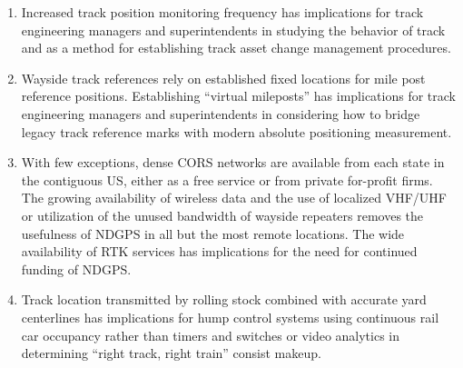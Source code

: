 \begin{enumerate}
\item
Increased track position monitoring frequency has implications for track engineering managers and superintendents in studying the behavior of track and as a method for establishing track asset change management procedures.

\item
Wayside track references rely on established fixed locations for mile post reference positions. Establishing ``virtual mileposts'' has implications for track engineering managers and superintendents in considering how to bridge legacy track reference marks with modern absolute positioning measurement.

\item
With few exceptions, dense CORS networks are available from each  state in the contiguous US, either as a free service or from private for-profit firms. The growing availability of wireless data and the use of localized VHF/UHF or utilization of the unused bandwidth of wayside repeaters removes the usefulness of NDGPS in all but the most remote locations. The wide availability of RTK services has implications for the need for continued funding of NDGPS.

\item
Track location transmitted by rolling stock combined with accurate yard centerlines has implications for hump control systems using continuous rail car occupancy rather than timers and switches or video analytics in determining ``right track, right train'' consist makeup. 

\end{enumerate}